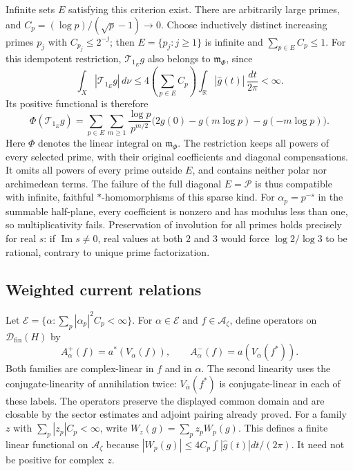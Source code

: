 \documentclass[11pt]{article}
\theoremstyle{definition}
\theoremstyle{remark}
\numberwithin{equation}{section}
\newcommand{\cA}{\mathcal A}
\newcommand{\R}{\mathbb R}
\begin{document}
Infinite sets $E$ satisfying this criterion exist.
There are arbitrarily large primes, and
$C_p=(\log p)/(\sqrt p-1)\to0$.
Choose inductively distinct increasing primes $p_j$ with $C_{p_j}\leq2^{-j}$;
then $E=\{p_j:j\geq1\}$ is infinite and $\sum_{p\in E}C_p\leq1$.
For this idempotent restriction, $\mathcal T_{1_E}g$ also belongs to
$\mathfrak m_\Phi$, since
\[
 \int_X|\mathcal T_{1_E}g|\,d\nu
 \leq4\left(\sum_{p\in E}C_p\right)
          \int_\R|\widehat g(t)|\,\frac{dt}{2\pi}<\infty.
\]
Its positive functional is therefore
\begin{equation}
 \Phi(\mathcal T_{1_E}g)=
 \sum_{p\in E}\sum_{m\geq1}\frac{\log p}{p^{m/2}}
 \bigl(2g(0)-g(m\log p)-g(-m\log p)\bigr).
 \label{eq:wc-sparse-functional}
\end{equation}
Here $\Phi$ denotes the linear integral on $\mathfrak m_\Phi$.
The restriction keeps all powers of every selected prime, with their
original coefficients and diagonal compensations.
It omits all powers of every prime outside $E$, and contains neither
polar nor archimedean terms.
The failure of the full diagonal $E=\mathcal P$ is thus compatible with
infinite, faithful $*$-homomorphisms of this sparse kind.
For $\alpha_p=p^{-s}$ in the summable half-plane, every coefficient is
nonzero and has modulus less than one, so multiplicativity fails.
Preservation of involution for all primes holds precisely for real $s$:
if $\operatorname{Im}s\ne0$, real values at both $2$ and $3$ would force
$\log2/\log3$ to be rational, contrary to unique prime factorization.

\subsection{Weighted current relations}

Let
$\mathcal E=\{\alpha:\sum_p|\alpha_p|^2C_p<\infty\}$.
For $\alpha\in\mathcal E$ and $f\in\cA_\zeta$, define operators on
$\mathcal D_{\mathrm{fin}}(H)$ by
\begin{equation}
 A_\alpha^+(f)=a^*(V_\alpha(f)),\qquad
 A_\alpha^-(f)=a(V_{\overline\alpha}(f^*)).
 \label{eq:wc-weighted-current}
\end{equation}
Both families are complex-linear in $f$ and in $\alpha$.
The second linearity uses the conjugate-linearity of annihilation twice:
$V_{\overline\alpha}(f^*)$ is conjugate-linear in each of these labels.
The operators preserve the displayed common domain and are closable by
the sector estimates and adjoint pairing already proved.
For a family $z$ with $\sum_p|z_p|C_p<\infty$, write
$W_z(g)=\sum_p z_pW_p(g)$.
This defines a finite linear functional on $\cA_\zeta$ because
$|W_p(g)|\leq4C_p\int|\widehat g(t)|dt/(2\pi)$.
It need not be positive for complex $z$.
\end{document}
